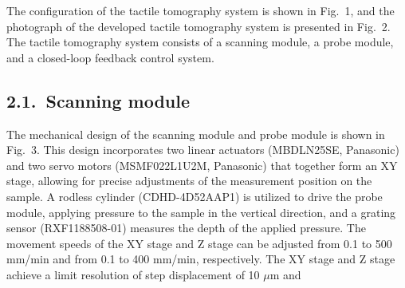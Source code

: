 \documentclass[11pt]{article}
\begin{document}
The configuration of the tactile tomography system is shown in
Fig.~1, and the photograph of the developed tactile tomography
system is presented in Fig.~2. The tactile tomography system
consists of a scanning module, a probe module, and a closed-loop
feedback control system.

\subsection*{2.1.\ Scanning module}

The mechanical design of the scanning module and probe module is
shown in Fig.~3. This design incorporates two linear actuators
(MBDLN25SE, Panasonic) and two servo motors (MSMF022L1U2M, Panasonic)
that together form an XY stage, allowing for precise adjustments of
the measurement position on the sample. A rodless cylinder
(CDHD-4D52AAP1) is utilized to drive the probe module, applying
pressure to the sample in the vertical direction, and a grating
sensor (RXF1188508-01) measures the depth of the applied pressure.
The movement speeds of the XY stage and Z stage can be adjusted
from 0.1 to 500 mm/min and from 0.1 to 400 mm/min, respectively.
The XY stage and Z stage achieve a limit resolution of step
displacement of 10 $\mu$m and
\end{document}
